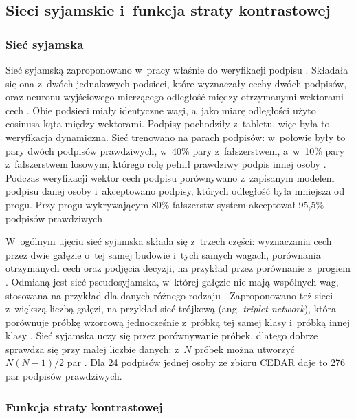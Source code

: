 \documentclass[12pt, twoside, openright]{article}
\begin{document}
\subsection{Sieci syjamskie i~funkcja straty kontrastowej}
\label{Subsec:syjamskie}

\subsubsection*{Sieć syjamska}

Sieć syjamską zaproponowano w~pracy \cite{bromley1993} właśnie do weryfikacji podpisu \cite{li2022}.
Składała się ona z~dwóch jednakowych podsieci, które wyznaczały cechy dwóch podpisów, oraz neuronu wyjściowego mierzącego odległość między otrzymanymi wektorami cech \cite{bromley1993}.
Obie podsieci miały identyczne wagi, a~jako miarę odległości użyto cosinusa kąta między wektorami.
Podpisy pochodziły z~tabletu, więc była to weryfikacja dynamiczna.
Sieć trenowano na parach podpisów: w~połowie były to pary dwóch podpisów prawdziwych, w~40\% pary z~fałszerstwem, a~w~10\% pary z~fałszerstwem losowym, którego rolę pełnił prawdziwy podpis innej osoby \cite{bromley1993}.
Podczas weryfikacji wektor cech podpisu porównywano z~zapisanym modelem podpisu danej osoby i~akceptowano podpisy, których odległość była mniejsza od progu.
Przy progu wykrywającym 80\% fałszerstw system akceptował 95,5\% podpisów prawdziwych \cite{bromley1993}.

W~ogólnym ujęciu sieć syjamska składa się z~trzech części: wyznaczania cech przez dwie gałęzie o~tej samej budowie i~tych samych wagach, porównania otrzymanych cech oraz podjęcia decyzji, na przykład przez porównanie z~progiem \cite{li2022}.
Odmianą jest sieć pseudosyjamska, w~której gałęzie nie mają wspólnych wag, stosowana na przykład dla danych różnego rodzaju \cite{li2022}.
Zaproponowano też sieci z~większą liczbą gałęzi, na przykład sieć trójkową (ang. \textit{triplet network}), która porównuje próbkę wzorcową jednocześnie z~próbką tej samej klasy i~próbką innej klasy \cite{li2022}.
Sieć syjamska uczy się przez porównywanie próbek, dlatego dobrze sprawdza się przy małej liczbie danych: z~$N$ próbek można utworzyć $N(N-1)/2$ par \cite{li2022}.
Dla 24 podpisów jednej osoby ze zbioru CEDAR daje to 276 par podpisów prawdziwych.

\subsubsection*{Funkcja straty kontrastowej}
\end{document}
